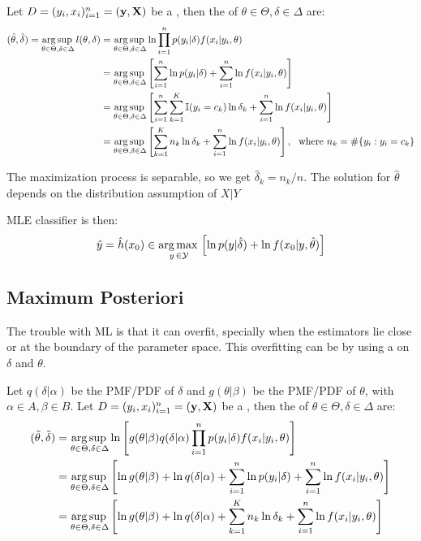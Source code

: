 Let $D=(y_i,x_i)_{i=1}^n=(\vb{y},\vb{X})$ be a , then the  of $\theta\in\Theta, \delta\in\Delta$ are:
\begin{align*}
    (\hat{\theta},\hat{\delta}) = \operatorname*{arg\,sup\,}_{\theta\in\Theta, \delta\in\Delta}l(\theta,\delta) &= \operatorname*{arg\,sup\,}_{\theta\in\Theta, \delta\in\Delta} \ln\prod_{i=1}^n p(y_i|\delta)f(x_i|y_i,\theta) \\
    &= \operatorname*{arg\,sup\,}_{\theta\in\Theta, \delta\in\Delta} \left[\sum_{i=1}^n\ln p(y_i|\delta)+\sum_{i=1}^n\ln f(x_i|y_i,\theta)\right] \\
    &= \operatorname*{arg\,sup\,}_{\theta\in\Theta, \delta\in\Delta} \left[\sum_{i=1}^n\sum_{k=1}^K \operatorname{\mathbb{I}}(y_i=c_k)\ln\delta_k+\sum_{i=1}^n\ln f(x_{i}|y_i,\theta)\right]\\
    &= \operatorname*{arg\,sup\,}_{\theta\in\Theta, \delta\in\Delta} \left[\sum_{k=1}^K n_k\ln\delta_k+\sum_{i=1}^n\ln f(x_{i}|y_i,\theta)\right],\ \text{ where } n_k=\#\{y_i : y_i=c_k\}
\end{align*}

The maximization process is separable, so we get $\hat{\delta}_{k}=n_k/n$. The solution for $\hat{\theta}$ depends on the distribution assumption of $X|Y$

MLE classifier is then:
\begin{equation*}
    \hat{y}=\hat{h}(x_0) \in \operatorname*{arg\,max\,}_{y\,\in\mathcal{Y}}\left[ \ln p(y|\hat{\delta})+\ln f(x_0|y,\hat{\theta})\right]
\end{equation*}

\subsection{Maximum Posteriori}
The trouble with ML is that it can overfit, specially when the estimators lie close or at the boundary of the parameter space. This overfitting can be  by using a  on $\delta$ and $\theta$. 

Let $q(\delta|\alpha)$ be the PMF/PDF of $\delta$ and $g(\theta|\beta)$ be the PMF/PDF of $\theta$, with  $\alpha\in A, \beta\in B$. Let $D=(y_i,x_i)_{i=1}^n=(\vb{y},\vb{X})$ be a , then the  of $\theta\in\Theta, \delta\in\Delta$ are:
\begin{align*}
    (\Tilde{\theta}, \Tilde{\delta}) 
    &= \operatorname*{arg\,sup\,}_{\theta\in\Theta, \delta\in\Delta} \ln\left[g(\theta|\beta)q(\delta|\alpha) \prod_{i=1}^np(y_i|\delta) f(x_i|y_i,\theta) \right]\\
    &= \operatorname*{arg\,sup\,}_{\theta\in\Theta, \delta\in\Delta} \left[\ln g(\theta|\beta)+\ln q(\delta|\alpha)+\sum_{i=1}^n\ln p(y_i|\delta)+\sum_{i=1}^n\ln f(x_i|y_i,\theta)\right]
    \\
    &= \operatorname*{arg\,sup\,}_{\theta\in\Theta, \delta\in\Delta} \left[\ln g(\theta|\beta)+\ln q(\delta|\alpha)+\sum_{k=1}^Kn_k\ln \delta_k+\sum_{i=1}^n\ln f(x_i|y_i,\theta)\right]
\end{align*}


